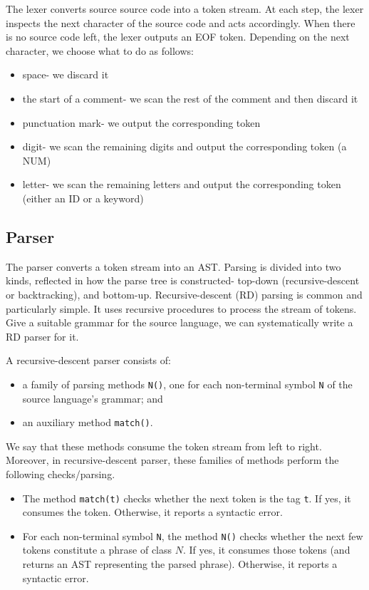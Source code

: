 \documentclass[a4paper, openany]{memoir}
\begin{document}
The lexer converts source source code into a token stream. At each step, the lexer inspects the next character of the source code and acts accordingly. When there is no source code left, the lexer outputs an EOF token. Depending on the next character, we choose what to do as follows:
\begin{itemize}
    \item space- we discard it
    \item the start of a comment- we scan the rest of the comment and then discard it
    \item punctuation mark- we output the corresponding token
    \item digit- we scan the remaining digits and output the corresponding token (a NUM)
    \item letter- we scan the remaining letters and output the corresponding token (either an ID or a keyword)
\end{itemize}

\subsection{Parser}
The parser converts a token stream into an AST. Parsing is divided into two kinds, reflected in how the parse tree is constructed- top-down (recursive-descent or backtracking), and bottom-up. Recursive-descent (RD) parsing is common and particularly simple. It uses recursive procedures to process the stream of tokens. Give a suitable grammar for the source language, we can systematically write a RD parser for it.

A recursive-descent parser consists of:
\begin{itemize}
    \item a family of parsing methods \texttt{N()}, one for each non-terminal symbol \texttt{N} of the source language's grammar; and
    \item an auxiliary method \texttt{match()}.
\end{itemize}
We say that these methods consume the token stream from left to right. Moreover, in recursive-descent parser, these families of methods perform the following checks/parsing.
\begin{itemize}
    \item The method \texttt{match(t)} checks whether the next token is the tag \texttt{t}. If yes, it consumes the token. Otherwise, it reports a syntactic error.
    \item For each non-terminal symbol \texttt{N}, the method \texttt{N()} checks whether the next few tokens constitute a phrase of class $N$. If yes, it consumes those tokens (and returns an AST representing the parsed phrase). Otherwise, it reports a syntactic error.
\end{itemize}
\end{document}
